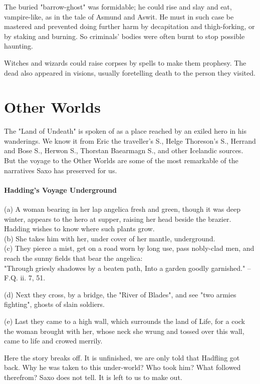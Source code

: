 \documentclass[10pt,a4paper]{report}
\begin{document}
The buried "barrow-ghost" was formidable; he could rise and slay and eat, vampire-like, as in the tale of Asmund and Aswit. He must in such case be mastered and prevented doing further harm by decapitation and thigh-forking, or by staking and burning. So criminals' bodies were often burnt to stop possible haunting.

Witches and wizards could raise corpses by spells to make them prophesy. The dead also appeared in visions, usually foretelling death to the person they visited.

\section{Other Worlds}
The "Land of Undeath" is spoken of as a place reached by an exiled hero in his wanderings. We know it from Eric the traveller's S., Helge Thoreson's S., Herrand and Bose S., Herwon S., Thorstan Baearmagn S., and other Icelandic sources. But the voyage to the Other Worlds are some of the most remarkable of the narratives Saxo has preserved for us.

\paragraph*{Hadding's Voyage Underground}
(a) A woman bearing in her lap angelica fresh and green, though it was deep winter, appears to the hero at supper, raising her head beside the brazier. Hadding wishes to know where such plants grow.\\

(b) She takes him with her, under cover of her mantle, underground.\\

(c) They pierce a mist, get on a road worn by long use, pass nobly-clad men, and reach the sunny fields that bear the angelica:\\

\indent "Through griesly shadowes by a beaten path,
\indent Into a garden goodly garnished."
\indent --F.Q. ii. 7, 51.

(d) Next they cross, by a bridge, the "River of Blades", and see "two armies fighting", ghosts of slain soldiers.

(e) Last they came to a high wall, which surrounds the land of Life, for a cock the woman brought with her, whose neck she wrung and tossed over this wall, came to life and crowed merrily.

Here the story breaks off. It is unfinished, we are only told that Hadfling got back. Why he was taken to this under-world? Who took him? What followed therefrom? Saxo does not tell. It is left to us to make out.
\end{document}
